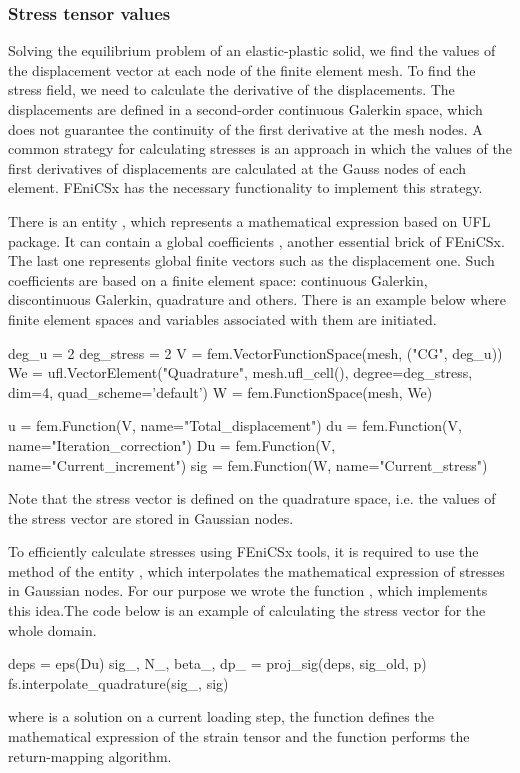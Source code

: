 \documentclass[12pt]{article}
\begin{document}
\subsubsection{Stress tensor values}

Solving the equilibrium problem of an elastic-plastic solid, we find the values of the displacement vector at each node of the finite element mesh. To find the stress field, we need to calculate the derivative of the displacements. The displacements are defined in a second-order continuous Galerkin space, which does not guarantee the continuity of the first derivative at the mesh nodes. A common strategy for calculating stresses is an approach in which the values of the first derivatives of displacements are calculated at the Gauss nodes of each element. FEniCSx has the necessary functionality to implement this strategy. 

There is an entity , which represents a mathematical expression based on UFL package. It can contain a global coefficients , another essential brick of FEniCSx. The last one represents global finite vectors such as the displacement one. Such coefficients are based on a finite element space: continuous Galerkin, discontinuous Galerkin, quadrature and others. There is an example below where finite element spaces and variables associated with them are initiated.

\begin{pythoncode}
    deg_u = 2
    deg_stress = 2
    V = fem.VectorFunctionSpace(mesh, ("CG", deg_u))
    We = ufl.VectorElement("Quadrature", mesh.ufl_cell(), degree=deg_stress, dim=4, quad_scheme='default')
    W = fem.FunctionSpace(mesh, We)

    u = fem.Function(V, name="Total_displacement")
    du = fem.Function(V, name="Iteration_correction")
    Du = fem.Function(V, name="Current_increment")
    sig = fem.Function(W, name="Current_stress")
\end{pythoncode}
Note that the stress vector  is defined on the quadrature space, i.e. the values of the stress vector are stored in Gaussian nodes. 

To efficiently calculate stresses using FEniCSx tools, it is required to use the  method of the entity , which interpolates the mathematical expression of stresses in Gaussian nodes. For our purpose we wrote the function , which implements this idea.The code below is an example of calculating the stress vector for the whole domain.
\begin{pythoncode}
    deps = eps(Du)
    sig_, N_, beta_, dp_ = proj_sig(deps, sig_old, p)
    fs.interpolate_quadrature(sig_, sig)
\end{pythoncode}
where  is a solution on a current loading step, the function  defines the mathematical expression of the strain tensor and the function  performs the return-mapping algorithm.
\end{document}
